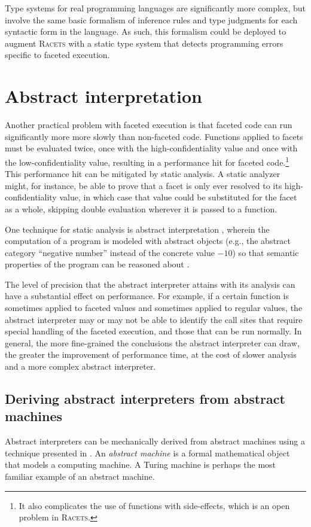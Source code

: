 \documentclass{article}
\begin{document}
Type systems for real programming languages are significantly more complex, but involve the same basic formalism of inference rules and type judgments for each syntactic form in the language. As such, this formalism could be deployed to augment \textsc{Racets} with a static type system that detects programming errors specific to faceted execution.



\section{Abstract interpretation\label{sec:ai}}
Another practical problem with faceted execution is that faceted code can run significantly more more slowly than non-faceted code. Functions applied to facets must be evaluated twice, once with the high-confidentiality value and once with the low-confidentiality value, resulting in a performance hit for faceted code.\footnote{It also complicates the use of functions with side-effects, which is an open problem in \textsc{Racets}.} This performance hit can be mitigated by static analysis. A static analyzer might, for instance, be able to prove that a facet is only ever resolved to its high-confidentiality value, in which case that value could be substituted for the facet as a whole, skipping double evaluation wherever it is passed to a function.

One technique for static analysis is abstract interpretation \cite{abstract-inter}, wherein the computation of a program is modeled with abstract objects (e.g., the abstract category ``negative number'' instead of the concrete value $-10$) so that semantic properties of the program can be reasoned about \cite{ai-original}.

The level of precision that the abstract interpreter attains with its analysis can have a substantial effect on performance. For example, if a certain function is sometimes applied to faceted values and sometimes applied to regular values, the abstract interpreter may or may not be able to identify the call sites that require special handling of the faceted execution, and those that can be run normally. In general, the more fine-grained the conclusions the abstract interpreter can draw, the greater the improvement of performance time, at the cost of slower analysis and a more complex abstract interpreter.


\subsection{Deriving abstract interpreters from abstract machines}
Abstract interpreters can be mechanically derived from abstract machines using a technique presented in \cite{aam}. An \textit{abstract machine} is a formal mathematical object that models a computing machine. A Turing machine is perhaps the most familiar example of an abstract machine.
\end{document}
